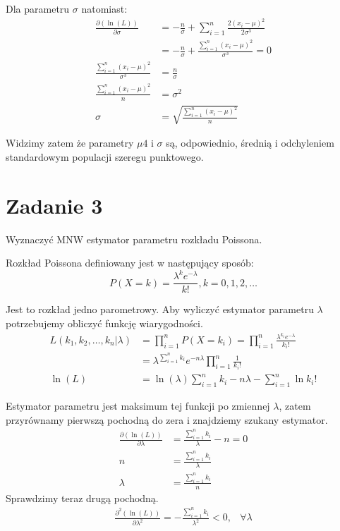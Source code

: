 \documentclass{article}
\begin{document}
Dla parametru $\sigma$ natomiast:
\begin{align*}
\frac{\partial(\ln(L))}{\partial\sigma} & = -\frac{n}{\sigma} + \sum_{i=1}^n \frac{2(x_i-\mu)^2}{2\sigma^3} \\
& = -\frac{n}{\sigma} + \frac{\sum_{i=1}^n (x_i-\mu)^2}{\sigma^3} = 0 \\
\frac{\sum_{i=1}^n (x_i-\mu)^2}{\sigma^3} & = \frac{n}{\sigma} \\
\frac{\sum_{i=1}^n (x_i-\mu)^2}{n} & = \sigma^2 \\
\sigma & = \sqrt{\frac{\sum_{i=1}^n (x_i-\mu)^2}{n}}
\end{align*}

Widzimy zatem że parametry $\mu4$ i $\sigma$ są, odpowiednio, średnią i odchyleniem standardowym populacji szeregu punktowego.

\section{Zadanie 3}
Wyznaczyć MNW estymator parametru rozkładu Poissona. \\ \par

Rozkład Poissona definiowany jest w następujący sposób:
\[ P(X = k) = \frac{\lambda^k e^{-\lambda}}{k!}, k = 0,1,2,\dots \]

Jest to rozkład jedno parometrowy. Aby wyliczyć estymator parametru $\lambda$ potrzebujemy obliczyć funkcję wiarygodności.
\begin{align*}
L(k_1,k_2,\dots,k_n|\lambda) & = \prod_{i=1}^n P(X = k_i) = \prod_{i=1}^n \frac{\lambda^{k_i} e^{-\lambda}}{k_i!} \\
& = \lambda^{\sum_{i=1}^n k_i} e^{-n\lambda} \prod_{i=1}^n \frac{1}{k_i!} \\
\ln(L) & = \ln(\lambda)\sum_{i=1}^n k_i - n\lambda - \sum_{i=1}^n \ln{k_i!}
\end{align*}

Estymator parametru jest maksimum tej funkcji po zmiennej $\lambda$, zatem przyrównamy pierwszą pochodną do zera i znajdziemy szukany estymator.
\begin{align*}
\frac{\partial(\ln(L))}{\partial\lambda} & = \frac{\sum_{i=1}^n k_i}{\lambda} - n = 0 \\
n & = \frac{\sum_{i=1}^n k_i}{\lambda} \\
\lambda & = \frac{\sum_{i=1}^n k_i}{n}
\end{align*}
Sprawdzimy teraz drugą pochodną.
\[ \begin{array}{cr} \frac{\partial^2(\ln(L))}{\partial\lambda^2} = -\frac{\sum_{i=1}^n k_i}{\lambda^2} < 0, & \forall \lambda \end{array} \]
\end{document}
